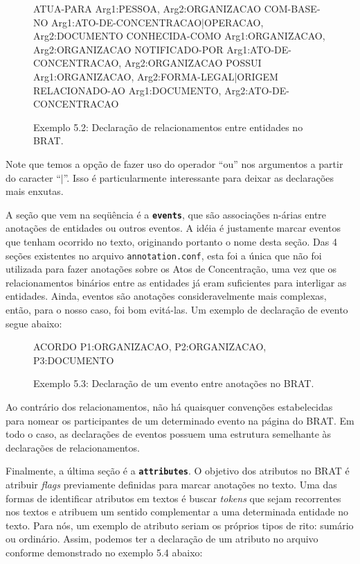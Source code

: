 \documentclass[11pt]{report}
\newcommand{\quotes}[1]{``#1''}
\begin{document}
\begin{figure}[h!]
\centering
\begin{boxedverbatim}
[relations]

ATUA-PARA       Arg1:PESSOA, Arg2:ORGANIZACAO
COM-BASE-NO     Arg1:ATO-DE-CONCENTRACAO|OPERACAO, Arg2:DOCUMENTO
CONHECIDA-COMO  Arg1:ORGANIZACAO, Arg2:ORGANIZACAO
NOTIFICADO-POR  Arg1:ATO-DE-CONCENTRACAO, Arg2:ORGANIZACAO
POSSUI          Arg1:ORGANIZACAO, Arg2:FORMA-LEGAL|ORIGEM
RELACIONADO-AO  Arg1:DOCUMENTO, Arg2:ATO-DE-CONCENTRACAO
\end{boxedverbatim}
\caption*{Exemplo 5.2: Declaração de relacionamentos entre entidades no BRAT.}
\end{figure}

Note que temos a opção de fazer uso do operador \quotes{ou} nos argumentos a partir do caracter \quotes{$\vert$}. Isso é particularmente interessante para deixar as
declarações mais enxutas.

A seção que vem na seqüência é a \textbf{\texttt{events}}, que são associações n-árias entre anotações de entidades ou outros eventos. A idéia é justamente marcar eventos que
tenham ocorrido no texto, originando portanto o nome desta seção. Das 4 seções existentes no arquivo \texttt{annotation.conf}, esta foi a única que não foi utilizada para
fazer anotações sobre os Atos de Concentração, uma vez que os relacionamentos binários entre as entidades já eram suficientes para interligar as entidades. Ainda, eventos
são anotações consideravelmente mais complexas, então, para o nosso caso, foi bom evitá-las. Um exemplo de declaração de evento segue abaixo:

\begin{figure}[h!]
\centering
\begin{boxedverbatim}
[events]

ACORDO  P1:ORGANIZACAO, P2:ORGANIZACAO, P3:DOCUMENTO
\end{boxedverbatim}
\caption*{Exemplo 5.3: Declaração de um evento entre anotações no BRAT.}
\end{figure}

Ao contrário dos relacionamentos, não há quaisquer convenções estabelecidas para nomear os participantes de um determinado evento na página do BRAT. Em todo o caso, as declarações
de eventos possuem uma estrutura semelhante às declarações de relacionamentos.

Finalmente, a última seção é a \textbf{\texttt{attributes}}. O objetivo dos atributos no BRAT é atribuir \textit{flags} previamente definidas para marcar anotações no texto.
Uma das formas de identificar atributos em textos é buscar \textit{tokens} que sejam recorrentes nos textos e atribuem um sentido complementar a uma determinada entidade no texto.
Para nós, um exemplo de atributo seriam os próprios tipos de rito: sumário ou ordinário. Assim, podemos ter a declaração de um atributo no arquivo conforme demonstrado no exemplo
5.4 abaixo:
\end{document}
